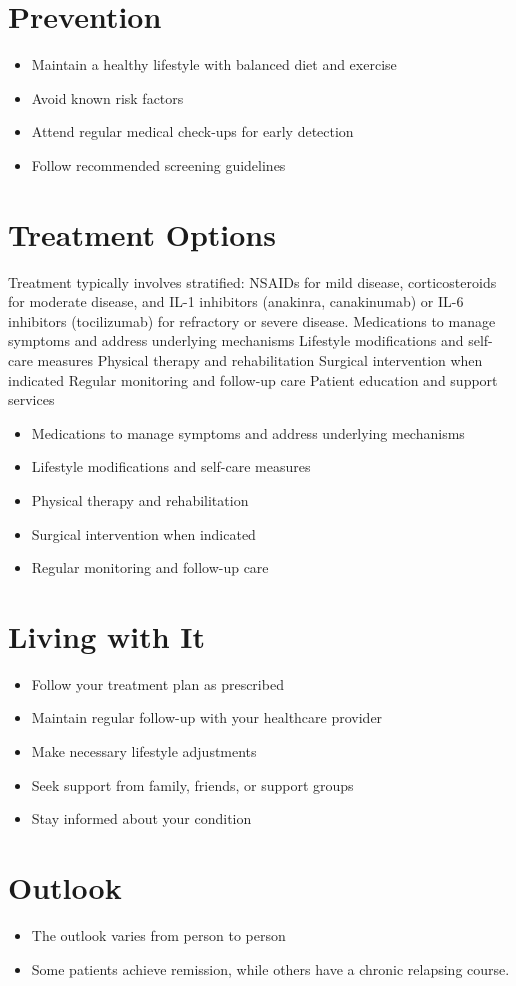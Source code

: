 \section{Prevention}
\begin{itemize}[noitemsep]
  \item Maintain a healthy lifestyle with balanced diet and exercise
  \item Avoid known risk factors
  \item Attend regular medical check-ups for early detection
  \item Follow recommended screening guidelines
\end{itemize}
\section{Treatment Options}
Treatment typically involves stratified: NSAIDs for mild disease, corticosteroids for moderate disease, and IL-1 inhibitors (anakinra, canakinumab) or IL-6 inhibitors (tocilizumab) for refractory or severe disease. Medications to manage symptoms and address underlying mechanisms Lifestyle modifications and self-care measures Physical therapy and rehabilitation Surgical intervention when indicated Regular monitoring and follow-up care Patient education and support services

\begin{itemize}[noitemsep]
  \item Medications to manage symptoms and address underlying mechanisms
  \item Lifestyle modifications and self-care measures
  \item Physical therapy and rehabilitation
  \item Surgical intervention when indicated
  \item Regular monitoring and follow-up care
\end{itemize}
\section{Living with It}
\begin{itemize}[noitemsep]
  \item Follow your treatment plan as prescribed
  \item Maintain regular follow-up with your healthcare provider
  \item Make necessary lifestyle adjustments
  \item Seek support from family, friends, or support groups
  \item Stay informed about your condition
\end{itemize}
\section{Outlook}
\begin{itemize}[noitemsep]
  \item The outlook varies from person to person
  \item Some patients achieve remission, while others have a chronic relapsing course.
\end{itemize}
